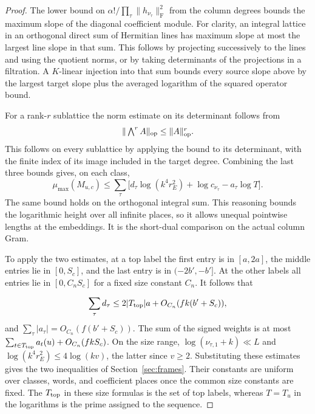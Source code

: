 \begin{proof}
The lower bound on \(\alpha!/\prod_\tau
\|h_{\nu_\tau}\|_{\mathrm F}^2\) from the column degrees
bounds the maximum slope of the diagonal coefficient module.
For clarity, an integral lattice in an orthogonal direct sum of
Hermitian lines has maximum slope at most the largest line
slope in that sum. This follows by projecting successively to the
lines and using the quotient norms, or by taking determinants
of the projections in a filtration. A \(K\)-linear injection
into that sum bounds every source slope above by the largest
target slope plus the averaged logarithm of the squared
operator bound.

For a rank-\(r\) sublattice the norm estimate on its determinant follows from
\[
  \|\textstyle\bigwedge^r A\|_{\rm op}\le\|A\|_{\rm op}^r .
\]
 This follows on every sublattice by applying
the bound to its determinant, with the finite index of its
image included in the target degree. Combining the last three
bounds gives, on each class,
\[
  \mu_{\max}(M_{u,c})\le
    \sum_\tau\bigl[d_\tau\log(k^4r_E^2)
                       +\log c_{\nu_\tau}-a_\tau\log T\bigr].
\]
The same bound holds on the orthogonal integral sum. This
reasoning bounds the logarithmic height over all infinite
places, so it allows unequal pointwise lengths at the
embeddings. It is the short-dual comparison on the actual
column Gram. \label{cor:selected-column-metric-5}

To apply the two estimates, at a top label the first entry is
in \([a,2a]\), the middle entries lie in \([0,S_c]\), and the
last entry is in \((-2b',-b']\). At the other labels all
entries lie in \([0,C_n S_c]\) for a fixed size constant \(C_n\).
It follows that

\[
  \sum_\tau d_\tau\le 2|T_{\rm top}|a+
O_{C_n}(fk(b'+S_c)),
\]
 and
\(\sum_\tau|a_\tau|=O_{C_n}(f(b'+S_c))\).
The sum of the signed weights is at most
\(\sum_{t\in T_{\rm top}}a_t(u)+O_{C_n}(fkS_c)\).
On the size range, \(\log(\nu_{\tau,1}+k)\ll L\) and
\(\log(k^4r_E^2)\le4\log(kv)\), the latter since \(v\ge2\).
Substituting these estimates gives the two inequalities of
Section~\ref{sec:frames}. Their constants are uniform over
classes, words, and coefficient places once the common size
constants are fixed. The \(T_{\rm top}\) in these size
formulas is the set of top labels, whereas \(T=T_u\) in the
logarithms is the prime assigned to the sequence.
\end{proof}

